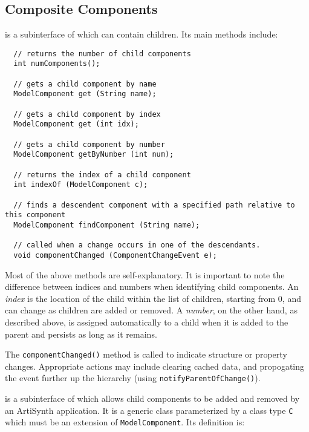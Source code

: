 \documentclass{article}
\begin{document}
\subsection{Composite Components}
\label{CompositeComponentSec}

 is a subinterface of 
which can contain children. Its main methods include:

\begin{lstlisting}
  // returns the number of child components
  int numComponents();
 
  // gets a child component by name
  ModelComponent get (String name);

  // gets a child component by index
  ModelComponent get (int idx);

  // gets a child component by number
  ModelComponent getByNumber (int num);

  // returns the index of a child component
  int indexOf (ModelComponent c);

  // finds a descendent component with a specified path relative to this component
  ModelComponent findComponent (String name);

  // called when a change occurs in one of the descendants.
  void componentChanged (ComponentChangeEvent e);
\end{lstlisting}

Most of the above methods are self-explanatory. It is important to
note the difference between indices and numbers when identifying child
components. An {\it index} is the location of the child within the list of
children, starting from 0, and can change as children are added or
removed. A {\it number}, on the other hand, as described above, is
assigned automatically to a child when it is added to the parent and
persists as long as it remains.

The {\tt componentChanged()} method is called to indicate structure or
property changes. Appropriate actions may include clearing cached
data, and propogating the event further up the hierarchy (using
{\tt notifyParentOfChange()}).

 is a subinterface of
 which allows child components to be
added and removed by an ArtiSynth application. It is a generic class
parameterized by a class type {\tt C} which must be an extension of
{\tt ModelComponent}. Its definition is:
\end{document}
